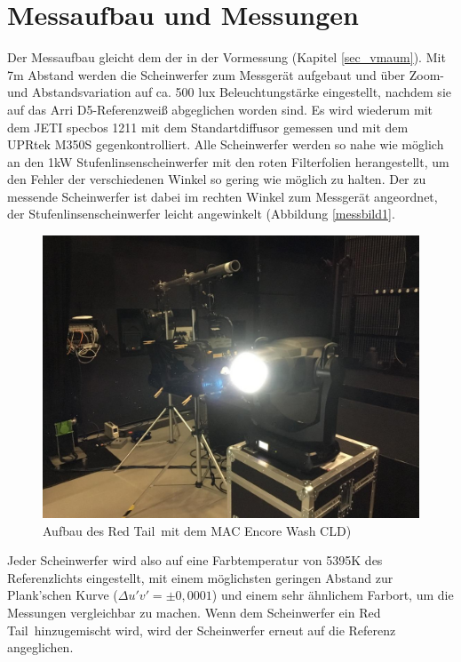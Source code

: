 \section{Messaufbau und Messungen}
\label{sec_hmaufbau}
Der Messaufbau gleicht dem der in der Vormessung (Kapitel \ref{sec_vmaum}). Mit 7m Abstand werden die Scheinwerfer zum Messgerät aufgebaut und über Zoom- und Abstandsvariation auf ca. 500 lux Beleuchtungstärke eingestellt, nachdem sie auf das Arri D5-Referenzweiß abgeglichen worden sind. Es wird wiederum mit dem JETI specbos 1211 mit dem Standartdiffusor gemessen und mit dem UPRtek M350S gegenkontrolliert. Alle Scheinwerfer werden so nahe wie möglich an den 1kW Stufenlinsenscheinwerfer mit den roten Filterfolien herangestellt, um den Fehler der verschiedenen Winkel so gering wie möglich zu halten. Der zu messende Scheinwerfer ist dabei im rechten Winkel zum Messgerät angeordnet, der Stufenlinsenscheinwerfer leicht angewinkelt (Abbildung \ref{messbild1}. 

\begin{figure}[H]     %
\centering
\includegraphics[width=1.0\textwidth]{bilder/messbild1} 
\caption {Aufbau des \glqq Red Tail\grqq\ mit dem MAC Encore Wash CLD)}\label{b_ref}
\end{figure}

Jeder Scheinwerfer wird also auf eine Farbtemperatur von 5395K des Referenzlichts eingestellt, mit einem möglichsten geringen Abstand zur Plank'schen Kurve ($ \Delta u'v'=\pm0,0001$) und einem sehr ähnlichem Farbort, um die Messungen vergleichbar zu machen. Wenn dem Scheinwerfer ein \glqq Red Tail\grqq\ hinzugemischt wird, wird der Scheinwerfer erneut auf die Referenz angeglichen. 

